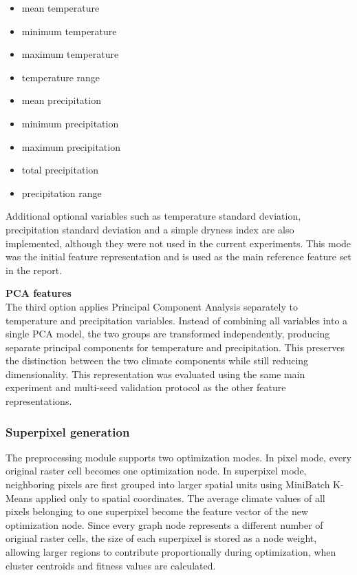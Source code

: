 \documentclass[11pt]{article}
\begin{document}
\begin{itemize}
  \item mean temperature
  \item minimum temperature
  \item maximum temperature
  \item temperature range
  \item mean precipitation
  \item minimum precipitation
  \item maximum precipitation
  \item total precipitation
  \item precipitation range
\end{itemize}

Additional optional variables such as temperature standard deviation, precipitation standard deviation and a simple dryness index are also implemented, although they were not used in the current experiments. This mode was the initial feature representation and is used as the main reference feature set in the report.

\textbf{PCA features} \\
The third option applies Principal Component Analysis separately to temperature and precipitation variables. Instead of combining all variables into a single PCA model, the two groups are transformed independently, producing separate principal components for temperature and precipitation. This preserves the distinction between the two climate components while still reducing dimensionality. This representation was evaluated using the same main experiment and multi-seed validation protocol as the other feature representations.

\subsubsection{Superpixel generation}
The preprocessing module supports two optimization modes. In pixel mode, every original raster cell becomes one optimization node. In superpixel mode, neighboring pixels are first grouped into larger spatial units using MiniBatch K-Means applied only to spatial coordinates. The average climate values of all pixels belonging to one superpixel become the feature vector of the new optimization node. Since every graph node represents a different number of original raster cells, the size of each superpixel is stored as a node weight, allowing larger regions to contribute proportionally during optimization, when cluster centroids and fitness values are calculated. 
\end{document}
